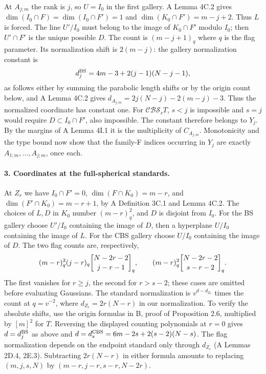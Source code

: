 At \(A_{j;m}\) the rank is \(j\), so \(U=I_0\) in the first gallery. A Lemma 4C.2 gives \(\dim(I_0\cap F)=\dim(I_0\cap F')=1\) and \(\dim(K_0\cap F')=m-j+2\). Thus \(L\) is forced. The line \(U'/I_0\) must belong to the image of \(K_0\cap F'\) modulo \(I_0\); then \(U'\cap F'\) is the unique possible \(D\). The count is \((m-j+1)_q\) where \(q\) is the flag parameter. Its normalization shift is \(2(m-j)\): the gallery normalization constant is
\[
 d_j^{\rm BS}=4m-3+2(j-1)(N-j-1),
\]
as follows either by summing the parabolic length shifts or by the origin count below, and A Lemma 4C.2 gives \(d_{A_{j;m}}=2j(N-j)-2(m-j)-3\). Thus the normalized coordinate has constant one. For \(\mathcal{CBS}_sT\), \(s<j\) is impossible and \(s=j\) would require \(D\subset I_0\cap F'\), also impossible. The constant therefore belongs to \(Y_j\). By the margins of A Lemma 4I.1 it is the multiplicity of \(C_{A_{j;m}}\). Monotonicity and the type bound now show that the family-F indices occurring in \(Y_j\) are exactly \(A_{1;m},\ldots,A_{j;m}\), once each.

\paragraph{3. Coordinates at the full-spherical standards.}
At \(Z_r\) we have \(I_0\cap F'=0\), \(\dim(F\cap K_0)=m-r\), and \(\dim(F'\cap K_0)=m-r+1\), by A Definition 3C.1 and Lemma 4C.2. The choices of \(L,D\) in \(K_0\) number \((m-r)_q^2\), and \(D\) is disjoint from \(I_0\). For the BS gallery choose \(U'/I_0\) containing the image of \(D\), then a hyperplane \(U/I_0\) containing the image of \(L\). For the CBS gallery choose \(U/I_0\) containing the image of \(D\). The two flag counts are, respectively,
\[
 (m-r)_q^2(j-r)_q\gb{N-2r-2}{j-r-1}_q,\qquad
 (m-r)_q^2\gb{N-2r-2}{s-r-2}_q.
\]
The first vanishes for \(r\ge j\), the second for \(r>s-2\); these cases are omitted before evaluating Gaussians. The standard normalization is \(v^{d-d_{Z_r}}\) times the count at \(q=v^{-2}\), where \(d_{Z_r}=2r(N-r)\) in our normalization. To verify the absolute shifts, use the origin formulas in B, proof of Proposition 2.6, multiplied by \([m]^2\) for \(T\). Reversing the displayed counting polynomials at \(r=0\) gives \(d=d_j^{\rm BS}\) as above and \(d=d_s^{\rm CBS}=6m-2s+2(s-2)(N-s)\). The flag normalization depends on the endpoint standard only through \(d_{Z_r}\) (A Lemmas 2D.4, 2E.3). Subtracting \(2r(N-r)\) in either formula amounts to replacing \((m,j,s,N)\) by \((m-r,j-r,s-r,N-2r)\).

